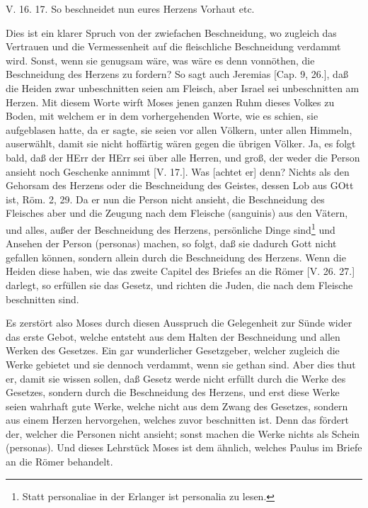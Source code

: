 \begin{schriftzitat}
V. 16. 17. So beschneidet nun eures Herzens Vorhaut etc.
\end{schriftzitat}

Dies ist ein klarer Spruch von der zwiefachen Beschneidung, wo zugleich das Vertrauen und die Vermessenheit auf die fleischliche Beschneidung verdammt wird. Sonst, wenn sie genugsam wäre, was wäre es denn vonnöthen, die Beschneidung des Herzens zu fordern? So sagt auch Jeremias [Cap. 9, 26.], daß die Heiden zwar unbeschnitten seien am Fleisch, aber Israel sei unbeschnitten am Herzen. Mit diesem Worte wirft Moses jenen ganzen Ruhm dieses Volkes zu Boden, mit welchem er in dem vorhergehenden Worte, wie es schien, sie aufgeblasen hatte, da er sagte, sie seien vor allen Völkern, unter allen Himmeln, auserwählt, damit sie nicht hoffärtig wären gegen die übrigen Völker. Ja, es folgt bald, daß der HErr der HErr sei über alle Herren, und groß, der weder die Person ansieht noch Geschenke annimmt [V. 17.]. Was [achtet er] denn? Nichts als den Gehorsam des Herzens oder die Beschneidung des Geistes, dessen Lob aus GOtt ist, Röm. 2, 29. Da er nun die Person nicht ansieht, die Beschneidung des Fleisches aber und die Zeugung nach dem Fleische (sanguinis) aus den Vätern, und alles, außer der Beschneidung des Herzens, persönliche Dinge sind\footnote{Statt personaliae in der Erlanger ist personalia zu lesen.} und Ansehen der Person (personas) machen, so folgt, daß sie dadurch Gott nicht gefallen können, sondern allein durch die Beschneidung des Herzens. Wenn die Heiden diese haben, wie das zweite Capitel des Briefes an die Römer [V. 26. 27.] darlegt, so erfüllen sie das Gesetz, und richten die Juden, die nach dem Fleische beschnitten sind.

Es zerstört also Moses durch diesen Ausspruch die Gelegenheit zur Sünde wider das erste Gebot, welche entsteht aus dem Halten der Beschneidung und allen Werken des Gesetzes. Ein gar wunderlicher Gesetzgeber, welcher zugleich die Werke gebietet und sie dennoch verdammt, wenn sie gethan sind. Aber dies thut er, damit sie wissen sollen, daß Gesetz werde nicht erfüllt durch die Werke des Gesetzes, sondern durch die Beschneidung des Herzens, und erst diese Werke seien wahrhaft gute Werke, welche nicht aus dem Zwang des Gesetzes, sondern aus einem Herzen hervorgehen, welches zuvor beschnitten ist. Denn das fördert der, welcher die Personen nicht ansieht; sonst machen die Werke nichts als Schein (personas). Und dieses Lehrstück Moses ist dem ähnlich, welches Paulus im Briefe an die Römer behandelt.

